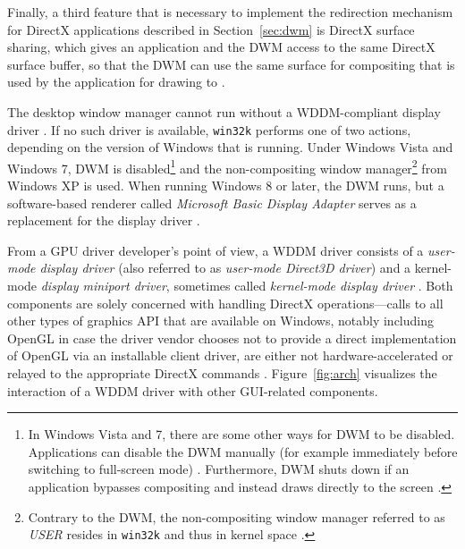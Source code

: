 			Finally, a third feature that is necessary to implement the redirection
			mechanism for DirectX applications described in Section~\ref{sec:dwm}
			is DirectX surface sharing, which gives an application and the DWM
			access to the same DirectX surface buffer, so that the DWM can use the
			same surface for compositing that is used by the application for
			drawing to \cite{dwmredirect}.

			The desktop window manager cannot run without a WDDM-compliant
			display driver \cite{dwmwddm}. If no such driver is available,
			\texttt{win32k} \cite{probertwin32k} performs one of two actions,
			depending on the version of Windows that is running. Under Windows
			Vista and Windows 7, DWM is disabled\footnote{In Windows Vista and
			7, there are some other ways for DWM to be disabled. Applications
			can disable the DWM manually (for example immediately before
			switching to full-screen mode) \cite{disabledwm}. Furthermore, DWM
			shuts down if an application bypasses compositing and instead draws
			directly to the screen \cite{dwmredirect}.} and the non-compositing
			window manager\footnote{Contrary to the DWM, the non-compositing
			window manager referred to as \textit{USER} resides in
			\texttt{win32k} and thus in kernel space \cite{probertwin32k}.}
			from Windows XP is used. When running Windows 8 or later, the DWM
			runs, but a software-based renderer called \textit{Microsoft Basic
			Display Adapter} serves as a replacement for the display driver
			\cite{dwmalwayson}.

			From a GPU driver developer's point of view, a WDDM driver consists
			of a \textit{user-mode display driver} (also referred to as
			\textit{user-mode Direct3D driver}) and a kernel-mode
			\textit{display miniport driver}, sometimes called \textit{kernel-mode
			display driver} \cite{wddmarch}. Both components are solely concerned with handling
			DirectX operations---calls to all other types of graphics API that
			are available on Windows, notably including OpenGL in case the driver
			vendor chooses not to provide a direct implementation of OpenGL via
			an installable client driver, are either not
			hardware-accelerated or relayed to the appropriate DirectX commands
			\cite{d2dvsgdi}.
			Figure~\ref{fig:arch} visualizes the interaction of a WDDM driver with
			other GUI-related components.

